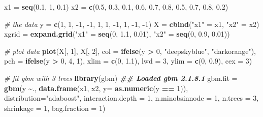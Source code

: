 \documentclass[
]{book}
\newenvironment{Shaded}{\begin{snugshade}}{\end{snugshade}}
\newcommand{\AttributeTok}[1]{\textcolor[rgb]{0.13,0.29,0.53}{#1}}
\newcommand{\CommentTok}[1]{\textcolor[rgb]{0.56,0.35,0.01}{\textit{#1}}}
\newcommand{\DecValTok}[1]{\textcolor[rgb]{0.00,0.00,0.81}{#1}}
\newcommand{\DocumentationTok}[1]{\textcolor[rgb]{0.56,0.35,0.01}{\textbf{\textit{#1}}}}
\newcommand{\FloatTok}[1]{\textcolor[rgb]{0.00,0.00,0.81}{#1}}
\newcommand{\FunctionTok}[1]{\textcolor[rgb]{0.13,0.29,0.53}{\textbf{#1}}}
\newcommand{\NormalTok}[1]{#1}
\newcommand{\OtherTok}[1]{\textcolor[rgb]{0.56,0.35,0.01}{#1}}
\newcommand{\SpecialCharTok}[1]{\textcolor[rgb]{0.81,0.36,0.00}{\textbf{#1}}}
\newcommand{\StringTok}[1]{\textcolor[rgb]{0.31,0.60,0.02}{#1}}
\theoremstyle{definition}
\theoremstyle{definition}
\theoremstyle{definition}
\theoremstyle{definition}
\theoremstyle{remark}
\begin{document}
\begin{Shaded}
\begin{Highlighting}[]
\NormalTok{  x1 }\OtherTok{=} \FunctionTok{seq}\NormalTok{(}\FloatTok{0.1}\NormalTok{, }\DecValTok{1}\NormalTok{, }\FloatTok{0.1}\NormalTok{)}
\NormalTok{  x2 }\OtherTok{=} \FunctionTok{c}\NormalTok{(}\FloatTok{0.5}\NormalTok{, }\FloatTok{0.3}\NormalTok{, }\FloatTok{0.1}\NormalTok{, }\FloatTok{0.6}\NormalTok{, }\FloatTok{0.7}\NormalTok{,}
         \FloatTok{0.8}\NormalTok{, }\FloatTok{0.5}\NormalTok{, }\FloatTok{0.7}\NormalTok{, }\FloatTok{0.8}\NormalTok{, }\FloatTok{0.2}\NormalTok{)}
  
  \CommentTok{\# the data}
\NormalTok{  y }\OtherTok{=} \FunctionTok{c}\NormalTok{(}\DecValTok{1}\NormalTok{, }\DecValTok{1}\NormalTok{, }\SpecialCharTok{{-}}\DecValTok{1}\NormalTok{, }\SpecialCharTok{{-}}\DecValTok{1}\NormalTok{, }\DecValTok{1}\NormalTok{, }
        \DecValTok{1}\NormalTok{, }\SpecialCharTok{{-}}\DecValTok{1}\NormalTok{, }\DecValTok{1}\NormalTok{, }\SpecialCharTok{{-}}\DecValTok{1}\NormalTok{, }\SpecialCharTok{{-}}\DecValTok{1}\NormalTok{)}
\NormalTok{  X }\OtherTok{=} \FunctionTok{cbind}\NormalTok{(}\StringTok{"x1"} \OtherTok{=}\NormalTok{ x1, }\StringTok{"x2"} \OtherTok{=}\NormalTok{ x2)}
\NormalTok{  xgrid }\OtherTok{=} \FunctionTok{expand.grid}\NormalTok{(}\StringTok{"x1"} \OtherTok{=} \FunctionTok{seq}\NormalTok{(}\DecValTok{0}\NormalTok{, }\FloatTok{1.1}\NormalTok{, }\FloatTok{0.01}\NormalTok{), }\StringTok{"x2"} \OtherTok{=} \FunctionTok{seq}\NormalTok{(}\DecValTok{0}\NormalTok{, }\FloatTok{0.9}\NormalTok{, }\FloatTok{0.01}\NormalTok{))}
  
  \CommentTok{\# plot data}
  \FunctionTok{plot}\NormalTok{(X[, }\DecValTok{1}\NormalTok{], X[, }\DecValTok{2}\NormalTok{], }\AttributeTok{col =} \FunctionTok{ifelse}\NormalTok{(y }\SpecialCharTok{\textgreater{}} \DecValTok{0}\NormalTok{, }\StringTok{"deepskyblue"}\NormalTok{, }\StringTok{"darkorange"}\NormalTok{),}
       \AttributeTok{pch =} \FunctionTok{ifelse}\NormalTok{(y }\SpecialCharTok{\textgreater{}} \DecValTok{0}\NormalTok{, }\DecValTok{4}\NormalTok{, }\DecValTok{1}\NormalTok{), }\AttributeTok{xlim =} \FunctionTok{c}\NormalTok{(}\DecValTok{0}\NormalTok{, }\FloatTok{1.1}\NormalTok{), }\AttributeTok{lwd =} \DecValTok{3}\NormalTok{,}
       \AttributeTok{ylim =} \FunctionTok{c}\NormalTok{(}\DecValTok{0}\NormalTok{, }\FloatTok{0.9}\NormalTok{), }\AttributeTok{cex =} \DecValTok{3}\NormalTok{)}
  
  \CommentTok{\# fit gbm with 3 trees}
  \FunctionTok{library}\NormalTok{(gbm)}
\DocumentationTok{\#\# Loaded gbm 2.1.8.1}
\NormalTok{  gbm.fit }\OtherTok{=} \FunctionTok{gbm}\NormalTok{(y }\SpecialCharTok{\textasciitilde{}}\NormalTok{., }\FunctionTok{data.frame}\NormalTok{(x1, x2, }\AttributeTok{y=} \FunctionTok{as.numeric}\NormalTok{(y }\SpecialCharTok{==} \DecValTok{1}\NormalTok{)), }
                \AttributeTok{distribution=}\StringTok{"adaboost"}\NormalTok{, }\AttributeTok{interaction.depth =} \DecValTok{1}\NormalTok{, }
                \AttributeTok{n.minobsinnode =} \DecValTok{1}\NormalTok{, }\AttributeTok{n.trees =} \DecValTok{3}\NormalTok{, }
                \AttributeTok{shrinkage =} \DecValTok{1}\NormalTok{, }\AttributeTok{bag.fraction =} \DecValTok{1}\NormalTok{)}
  

\end{Highlighting}
\end{Shaded}
\end{document}
